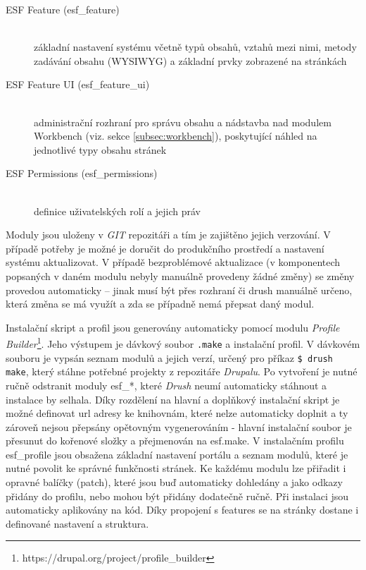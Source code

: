 \begin{description}
  \item[ESF Feature (esf\_feature)] \hfill \\ 
  základní nastavení systému včetně typů obsahů, vztahů mezi nimi, metody zadávání obsahu (WYSIWYG) a základní prvky zobrazené na stránkách

  \item[ESF Feature UI (esf\_feature\_ui)] \hfill \\ 
  administrační rozhraní pro správu obsahu a nádstavba nad modulem Workbench (viz. sekce \ref{subsec:workbench}), poskytující náhled na jednotlivé typy obsahu stránek
  \item[ESF Permissions (esf\_permissions)] \hfill \\ 
  definice uživatelských rolí a jejich práv
\end{description}

Moduly jsou uloženy v \emph{GIT} repozitáři a tím je zajištěno jejich verzování. V případě potřeby je možné je doručit do produkčního prostředí a nastavení systému aktualizovat. V případě bezproblémové aktualizace (v komponentech popsaných v daném modulu nebyly manuálně provedeny žádné změny) se změny provedou automaticky – jinak musí být přes rozhraní či drush manuálně určeno, která změna se má využít a zda se případně nemá přepsat daný modul.

Instalační skript a profil jsou generovány automaticky pomocí modulu \emph{Profile Builder}\footnote{https://drupal.org/project/profile\_builder}. Jeho výstupem je dávkový soubor \texttt{.make} a instalační profil. V dávkovém souboru je vypsán seznam modulů a jejich verzí, určený pro příkaz \texttt{\$ drush make}, který stáhne potřebné projekty z repozitáře \emph{Drupalu}. Po vytvoření je nutné ručně odstranit moduly esf\_*, které \emph{Drush} neumí automaticky stáhnout a instalace by selhala. Díky rozdělení na hlavní a doplňkový instalační skript je možné definovat url adresy ke knihovnám, které nelze automaticky doplnit a ty zároveň nejsou přepsány opětovným vygenerováním - hlavní instalační soubor je přesunut do kořenové složky a přejmenován na esf.make. V instalačním profilu esf\_profile jsou obsažena základní nastavení portálu a seznam modulů, které je nutné povolit ke správné funkčnosti stránek. Ke každému modulu lze přiřadit i opravné balíčky (patch), které jsou buď automaticky dohledány a jako odkazy přidány do profilu, nebo mohou být přidány dodatečně ručně. Při instalaci jsou automaticky aplikovány na kód. Díky propojení s features se na stránky dostane i definované nastavení a struktura.

